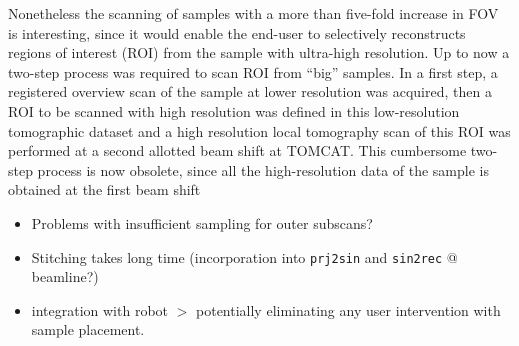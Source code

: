 Nonetheless the scanning of samples with a more than five-fold increase in FOV is interesting, since it would enable the end-user to selectively reconstructs regions of interest (ROI) from the sample with ultra-high resolution. Up to now a two-step process was required to scan ROI from ``big'' samples. In a first step, a registered overview scan of the sample at lower resolution was acquired, then a ROI to be scanned with high resolution was defined in this low-resolution tomographic dataset and a high resolution local tomography scan of this ROI was performed at a second allotted beam shift at TOMCAT. This cumbersome two-step process is now obsolete, since all the high-resolution data of the sample is obtained at the first beam shift

\begin{itemize}
	\item Problems with insufficient sampling for outer subscans?
	\item Stitching takes long time (incorporation into \verb+prj2sin+ and \verb+sin2rec+ @ beamline?)
	\item integration with robot $>$ potentially eliminating any user intervention with sample placement.
\end{itemize}